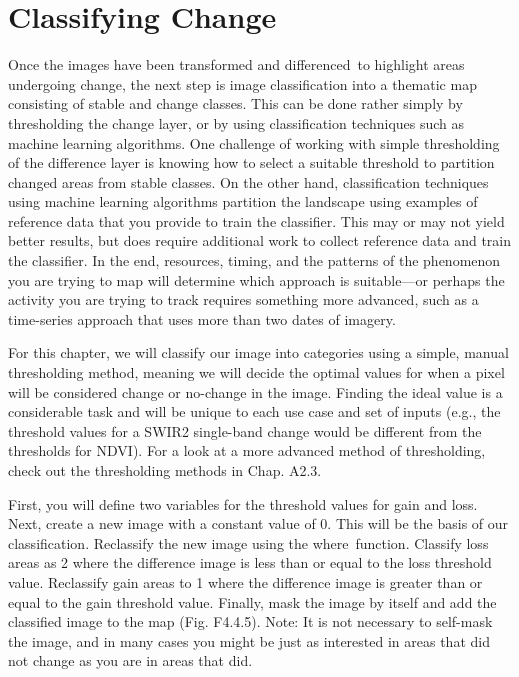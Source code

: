 \documentclass[
  letterpaper,
  DIV=11,
  numbers=noendperiod]{scrreprt}
\begin{document}
\hypertarget{classifying-change}{%
\section{Classifying Change}\label{classifying-change}}

Once the images have been transformed and differenced~to highlight areas
undergoing change, the next step is image classification into a thematic
map consisting of stable and change classes. This can be done rather
simply by thresholding the change layer, or by using classification
techniques such as machine learning algorithms. One challenge of working
with simple thresholding of the difference layer is knowing how to
select a suitable threshold to partition changed areas from stable
classes. On the other hand, classification techniques using machine
learning algorithms partition the landscape using examples of reference
data that you provide to train the classifier. This may or may not yield
better results, but does require additional work to collect reference
data and train the classifier. In the end, resources, timing, and the
patterns of the phenomenon you are trying to map will determine which
approach is suitable---or perhaps the activity you are trying to track
requires something more advanced, such as a time-series approach that
uses more than two dates of imagery.

For this chapter, we will classify our image into categories using a
simple, manual thresholding method, meaning we will decide the optimal
values for when a pixel will be considered change or no-change in the
image. Finding the ideal value is a considerable task and will be unique
to each use case and set of inputs (e.g., the threshold values for a
SWIR2 single-band change would be different from the thresholds for
NDVI). For a look at a more advanced method of thresholding, check out
the thresholding methods in Chap. A2.3.

First, you will define two variables for the threshold values for gain
and loss. Next, create a new image with a constant value of 0. This will
be the basis of our classification. Reclassify the new image using the
where~function. Classify loss areas as 2 where the difference image is
less than or equal to the loss threshold value. Reclassify gain areas to
1 where the difference image is greater than or equal to the gain
threshold value. Finally, mask the image by itself and add the
classified image to the map (Fig. F4.4.5). Note: It is not necessary to
self-mask the image, and in many cases you might be just as interested
in areas that did not change as you are in areas that did.
\end{document}
